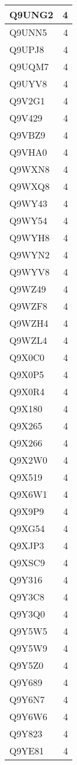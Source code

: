 \documentclass[
]{book}
\theoremstyle{definition}
\theoremstyle{definition}
\theoremstyle{definition}
\theoremstyle{definition}
\theoremstyle{remark}
\begin{document}
\begin{table}
\begin{tabular}{l|r}
\hline
Q9UNG2 & 4\\
\hline
Q9UNN5 & 4\\
\hline
Q9UPJ8 & 4\\
\hline
Q9UQM7 & 4\\
\hline
Q9UYV8 & 4\\
\hline
Q9V2G1 & 4\\
\hline
Q9V429 & 4\\
\hline
Q9VBZ9 & 4\\
\hline
Q9VHA0 & 4\\
\hline
Q9WXN8 & 4\\
\hline
Q9WXQ8 & 4\\
\hline
Q9WY43 & 4\\
\hline
Q9WY54 & 4\\
\hline
Q9WYH8 & 4\\
\hline
Q9WYN2 & 4\\
\hline
Q9WYV8 & 4\\
\hline
Q9WZ49 & 4\\
\hline
Q9WZF8 & 4\\
\hline
Q9WZH4 & 4\\
\hline
Q9WZL4 & 4\\
\hline
Q9X0C0 & 4\\
\hline
Q9X0P5 & 4\\
\hline
Q9X0R4 & 4\\
\hline
Q9X180 & 4\\
\hline
Q9X265 & 4\\
\hline
Q9X266 & 4\\
\hline
Q9X2W0 & 4\\
\hline
Q9X519 & 4\\
\hline
Q9X6W1 & 4\\
\hline
Q9X9P9 & 4\\
\hline
Q9XG54 & 4\\
\hline
Q9XJP3 & 4\\
\hline
Q9XSC9 & 4\\
\hline
Q9Y316 & 4\\
\hline
Q9Y3C8 & 4\\
\hline
Q9Y3Q0 & 4\\
\hline
Q9Y5W5 & 4\\
\hline
Q9Y5W9 & 4\\
\hline
Q9Y5Z0 & 4\\
\hline
Q9Y689 & 4\\
\hline
Q9Y6N7 & 4\\
\hline
Q9Y6W6 & 4\\
\hline
Q9Y823 & 4\\
\hline
Q9YE81 & 4\\

\end{tabular}
\end{table}
\end{document}
